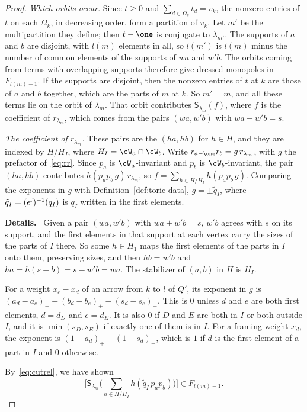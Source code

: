 \documentclass[11pt]{amsart}
\newenvironment{details}{\par\color{black!60!green}\noindent\textbf{Details.}\ }{\par}
\begin{document}
\begin{proof}
\emph{Which orbits occur.}  Since $t\ge0$ and $\sum_{d\in\Omega_k}t_d=v_k$, the
nonzero entries of $t$ on each $\Omega_k$, in decreasing order, form a
partition of $v_k$.  Let $m'$ be the multipartition they define; then $t-\one$
is conjugate to $\lambda_{m'}$.  The supports of $a$ and $b$ are disjoint, with
$l(m)$ elements in all, so $l(m')$ is $l(m)$ minus the number of common
elements of the supports of $wa$ and $w'b$.  The orbits coming from terms
with overlapping supports therefore give dressed monopoles in
$F_{l(m)-1}$.  If the supports are disjoint, then the nonzero entries of $t$
at $k$ are those of $a$ and $b$ together, which are the parts of $m$ at $k$.
So $m'=m$, and all these terms lie on the orbit of $\lambda_m$.  That orbit
contributes $\mathsf S_{\lambda_m}(f)$, where $f$ is the coefficient of
$r_{\lambda_m}$, which comes from the pairs $(wa,w'b)$ with $wa+w'b=s$.

\emph{The coefficient of $r_{\lambda_m}$.}  These pairs are the $(ha,hb)$
for $h\in H$, and they are indexed by $H/H_I$, where $H_I=\cW_a\cap\cW_b$.
Write $r_{a-\one}r_b=g\,r_{\lambda_m}$, with $g$ the prefactor
of~\eqref{eq:rr}.  Since $p_a$ is $\cW_a$-invariant and $p_b$ is
$\cW_b$-invariant, the pair $(ha,hb)$ contributes $h(p_ap_b\,g)\,r_{\lambda_m}$,
so $f=\sum_{h\in H/H_I}h(p_ap_b\,g)$.  Comparing the exponents in $g$ with
Definition~\ref{def:toric-data}, $g=\pm\tilde q_I$, where $\tilde
q_I=(\epsilon^{\rm f})^{-1}(q_I)$ is $q_I$ written in the first elements.
\begin{details}
Given a pair $(wa,w'b)$ with $wa+w'b=s$,
$w'b$ agrees with $s$ on its support, and the first elements in that support
at each vertex carry the sizes of the parts of $I$ there.  So some $h\in H_1$
maps the first elements of the parts in $I$ onto them, preserving sizes, and
then $hb=w'b$ and $ha=h(s-b)=s-w'b=wa$.  The stabilizer of $(a,b)$ in $H$ is
$H_I$.

For a weight $x_e-x_d$ of an arrow from $k$ to $l$ of $Q'$,
its exponent in $g$ is
$(a_d-a_e)_++(b_d-b_e)_+-(s_d-s_e)_+$.  This is $0$ unless $d$ and $e$ are
both first elements, $d=d_D$ and $e=d_E$.  It is also $0$ if $D$ and $E$ are
both in $I$ or both outside $I$, and it is $\min(s_D,s_E)$ if exactly one of
them is in $I$.  For a framing weight $x_d$, the exponent is
$(1-a_d)_+-(1-s_d)_+$, which is $1$ if $d$ is the first element of a part in
$I$ and $0$ otherwise.
\end{details}
By~\eqref{eq:cutrel}, we have shown
\begin{equation}\label{eq:cutclass}
 \Big[\mathsf S_{\lambda_m}\Big(\textstyle\sum_{h\in H/H_I}h(\tilde
 q_I\,p_ap_b)\Big)\Big]\in F_{l(m)-1}.
\end{equation}


\end{proof}
\end{document}
